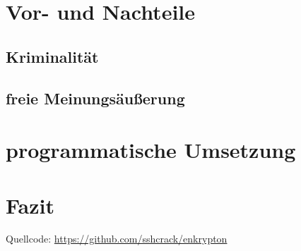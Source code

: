 \documentclass[a4paper,ngerman, headheight=28pt,12pt]{scrartcl}
\begin{document}
\section{Vor- und Nachteile}
\subsection{Kriminalität}
\subsection{freie Meinungsäußerung}

\section{programmatische Umsetzung}

\section{Fazit}

\pagebreak
\nolinenumbers{}
\printbibliography[notkeyword={figure}]
\printbibliography[heading=subbibliography,title={Anhang},keyword={figure}]
Quellcode: \href{https://github.com/sshcrack/enkrypton}{https://github.com/sshcrack/enkrypton}
\end{document}
